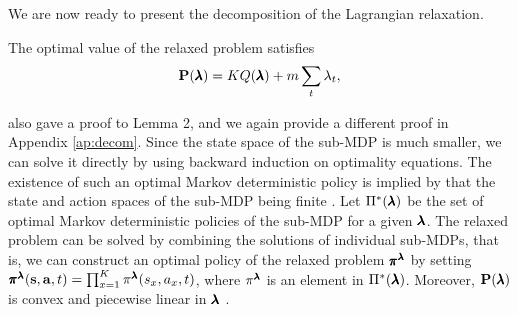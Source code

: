 We are now ready to present the decomposition of the Lagrangian relaxation.
\begin{lemma}\label{th:decom}
The optimal value of the relaxed problem satisfies 
\begin{equation}\label{dec}
\mathbf{P}(\pmb{\lambda})=K Q(\pmb{\lambda}) + m\sum_t\lambda_t,
\end{equation}
\end{lemma}
\cite{adel2008} also gave a proof to Lemma 2, and we again provide a different proof in Appendix \ref{ap:decom}.
Since the state space of the sub-MDP is much smaller, we can solve it directly by using backward induction on optimality equations. 
The existence of such an optimal Markov deterministic policy is implied by that the state and action spaces of the sub-MDP being finite \citep{putermanBook}. Let $\Pi^*(\pmb{\lambda})$ be the set of optimal Markov deterministic policies of the sub-MDP for a given $\pmb{\lambda}$. The relaxed problem can be solved by combining the solutions of individual sub-MDPs, that is, we can construct an optimal policy of the relaxed problem $\pmb{\pi}^{\pmb{\lambda}}$ by setting $\pmb{\pi}^{\pmb{\lambda}}(\mathbf{s},\mathbf{a},t) = \prod_{x=1}^K\pi^{\pmb{\lambda}}(s_x,a_x,t)$, where $\pi^{\pmb{\lambda}}$ is an element in $\Pi^*(\pmb{\lambda})$. 
Moreover, $\mathbf{P}(\pmb{\lambda})$ is convex and piecewise linear in $\pmb{\lambda}$ \citep{adel2008}. 
